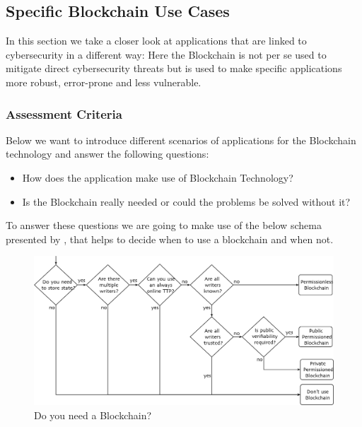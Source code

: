 \subsection{Specific Blockchain Use Cases}
\label{subsec:03_applications}

In this section we take a closer look at applications that are linked to cybersecurity in a different way: Here the Blockchain is not per se used to mitigate direct cybersecurity threats but is used to make specific applications more robust, error-prone and less vulnerable.

\subsubsection{Assessment Criteria}
Below we want to introduce different scenarios of applications for the Blockchain technology and answer the following questions:
\begin{itemize}
    \item How does the application make use of Blockchain Technology?
    \item Is the Blockchain really needed or could the problems be solved without it?
\end{itemize}
To answer these questions we are going to make use of the below schema presented by \cite{Wust2017}, that helps to decide when to use a blockchain and when not.
\begin{figure}[ht!]
    \begin{center}
        \includegraphics[scale=0.6]{Talk7/img/app/BCorNot}
    \end{center}
    \caption{Do you need a Blockchain?}
    \label{blockchain_or_not}
\end{figure}

